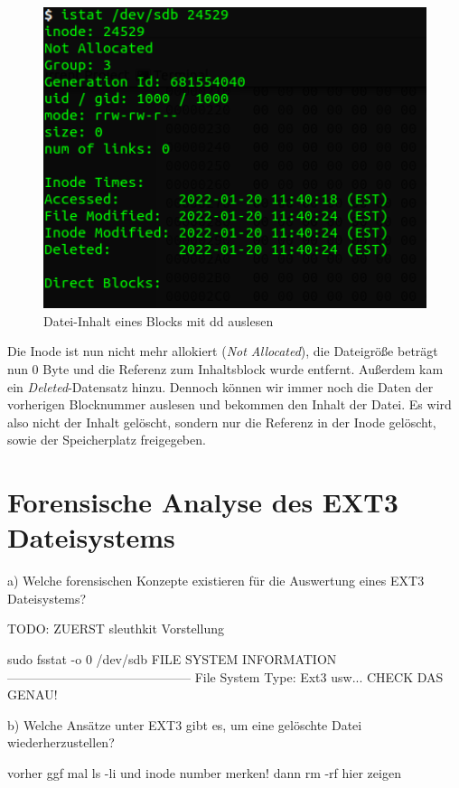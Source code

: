 \begin{figure}[H]
	\centering
	\includegraphics[width=12cm,keepaspectratio=true]{pictures/istatafterdelete.png}
	\caption{
		Datei-Inhalt eines Blocks mit dd auslesen
	}
	\label{fig:istatafterdelete}
\end{figure}

Die Inode ist nun nicht mehr allokiert (\textit{Not Allocated}), die Dateigröße beträgt nun 0 Byte und die Referenz zum Inhaltsblock wurde entfernt. Außerdem kam ein \textit{Deleted}-Datensatz hinzu. Dennoch können wir immer noch die Daten der vorherigen Blocknummer auslesen und bekommen den Inhalt der Datei. Es wird also nicht der Inhalt gelöscht, sondern nur die Referenz in der Inode gelöscht, sowie der Speicherplatz freigegeben.

\newpage

\section{Forensische Analyse des EXT3 Dateisystems}

a) Welche forensischen Konzepte existieren für die Auswertung eines EXT3 Dateisystems? 

TODO: ZUERST sleuthkit Vorstellung


sudo fsstat -o 0 /dev/sdb
FILE SYSTEM INFORMATION
--------------------------------------------
File System Type: Ext3
usw... CHECK DAS GENAU!


b) Welche Ansätze unter EXT3 gibt es, um eine gelöschte Datei wiederherzustellen?

vorher ggf mal ls -li und inode number merken!
dann rm -rf hier zeigen

